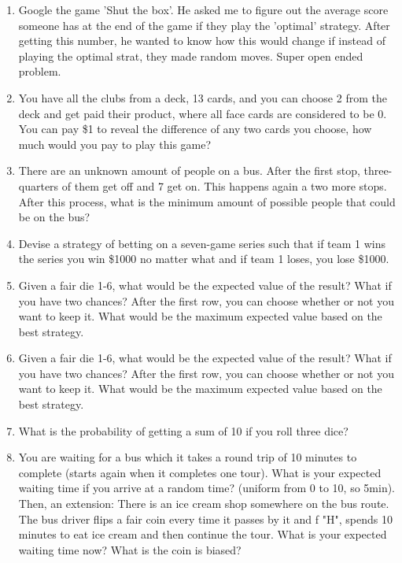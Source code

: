 \documentclass{article}
\begin{document}
\begin{enumerate}
     \item Google the game 'Shut the box'. He asked me to figure out the average score someone has at the end of the game if they play the 'optimal' strategy. After getting this number, he wanted to know how this would change if instead of playing the optimal strat, they made random moves. Super open ended problem.


    \item You have all the clubs from a deck, 13 cards, and you can choose 2 from the deck and get paid their product, where all face cards are considered to be 0. You can pay \$1 to reveal the difference of any two cards you choose, how much would you pay to play this game?

    \item There are an unknown amount of people on a bus. After the first stop, three-quarters of them get off and 7 get on. This happens again a two more stops. After this process, what is the minimum amount of possible people that could be on the bus?

    \item Devise a strategy of betting on a seven-game series such that if team 1 wins the series you win \$1000 no matter what and if team 1 loses, you lose \$1000.


    \item Given a fair die 1-6, what would be the expected value of the result? What if you have two chances? After the first row, you can choose whether or not you want to keep it. What would be the maximum expected value based on the best strategy.

    \item Given a fair die 1-6, what would be the expected value of the result? What if you have two chances? After the first row, you can choose whether or not you want to keep it. What would be the maximum expected value based on the best strategy.

    \item What is the probability of getting a sum of 10 if you roll three dice?

    \item You are waiting for a bus which it takes a round trip of 10 minutes to complete (starts again when it completes one tour). What is your expected waiting time if you arrive at a random time? (uniform from 0 to 10, so 5min). Then, an extension: There is an ice cream shop somewhere on the bus route. The bus driver flips a fair coin every time it passes by it and f "H", spends 10 minutes to eat ice cream and then continue the tour. What is your expected waiting time now? What is the coin is biased?


\end{enumerate}
\end{document}
